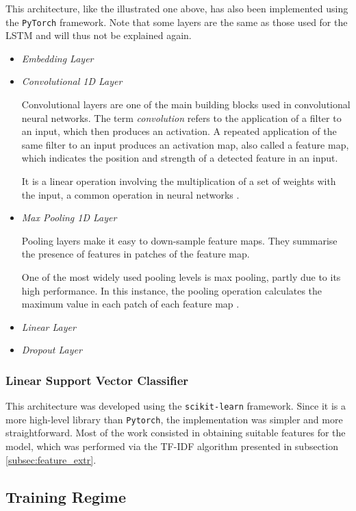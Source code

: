 \documentclass[letterpaper,11pt]{article}
\begin{document}
This architecture, like the illustrated one above, has also been implemented using the \verb|PyTorch| framework. Note that some layers are the same as those used for the LSTM and will thus not be explained again.

\begin{itemize}
  \item \textit{Embedding Layer}
  \item \textit{Convolutional 1D Layer}
  
  Convolutional layers are one of the main building blocks used in convolutional neural networks. The term \textit{convolution} refers to the application of a filter to an input, which then produces an activation. A repeated application of the same filter to an input produces an activation map, also called a feature map, which indicates the position and strength of a detected feature in an input.

  It is a linear operation involving the multiplication of a set of weights with the input, a common operation in neural networks \cite{CNN_how}.
  \item \textit{Max Pooling 1D Layer}
  
  Pooling layers make it easy to down-sample feature maps. They summarise the presence of features in patches of the feature map. 
  
  One of the most widely used pooling levels is max pooling, partly due to its high performance. In this instance, the pooling operation calculates the maximum value in each patch of each feature map \cite{MaxPool_how}.
  \item \textit{Linear Layer}
  \item \textit{Dropout Layer}
\end{itemize}





\subsubsection*{Linear Support Vector Classifier}

This architecture was developed using the \verb|scikit-learn| framework. Since it is a more high-level library than \verb|Pytorch|, the implementation was simpler and more straightforward. Most of the work consisted in obtaining suitable features for the model, which was performed via the TF-IDF algorithm presented in subsection \ref{subsec:feature_extr}.

\subsection{Training Regime}
\label{subsec:fine_tuning}
\end{document}
